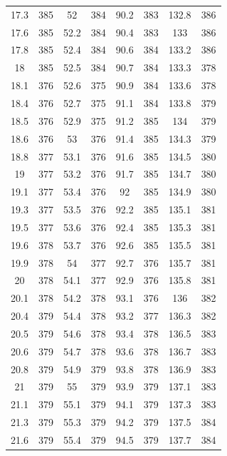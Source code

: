\documentclass[12pt]{ctexart}
\numberwithin{equation}{section}
\begin{document}
\begin{longtable}{cc|cc|cc|cc}
17.3  &  385  &  52  &  384  &  90.2  &  383  &  132.8  &  386  \\
17.6  &  385  &  52.2  &  384  &  90.4  &  383  &  133  &  386  \\
17.8  &  385  &  52.4  &  384  &  90.6  &  384  &  133.2  &  386  \\
18  &  385  &  52.5  &  384  &  90.7  &  384  &  133.3  &  378  \\
18.1  &  376  &  52.6  &  375  &  90.9  &  384  &  133.6  &  378  \\
18.4  &  376  &  52.7  &  375  &  91.1  &  384  &  133.8  &  379  \\
18.5  &  376  &  52.9  &  375  &  91.2  &  385  &  134  &  379  \\
18.6  &  376  &  53  &  376  &  91.4  &  385  &  134.3  &  379  \\
18.8  &  377  &  53.1  &  376  &  91.6  &  385  &  134.5  &  380  \\
19  &  377  &  53.2  &  376  &  91.7  &  385  &  134.7  &  380  \\
19.1  &  377  &  53.4  &  376  &  92  &  385  &  134.9  &  380  \\
19.3  &  377  &  53.5  &  376  &  92.2  &  385  &  135.1  &  381  \\
19.5  &  377  &  53.6  &  376  &  92.4  &  385  &  135.3  &  381  \\
19.6  &  378  &  53.7  &  376  &  92.6  &  385  &  135.5  &  381  \\
19.9  &  378  &  54  &  377  &  92.7  &  376  &  135.7  &  381  \\
20  &  378  &  54.1  &  377  &  92.9  &  376  &  135.8  &  381  \\
20.1  &  378  &  54.2  &  378  &  93.1  &  376  &  136  &  382  \\
20.4  &  379  &  54.4  &  378  &  93.2  &  377  &  136.3  &  382  \\
20.5  &  379  &  54.6  &  378  &  93.4  &  378  &  136.5  &  383  \\
20.6  &  379  &  54.7  &  378  &  93.6  &  378  &  136.7  &  383  \\
20.8  &  379  &  54.9  &  379  &  93.8  &  378  &  136.9  &  383  \\
21  &  379  &  55  &  379  &  93.9  &  379  &  137.1  &  383  \\
21.1  &  379  &  55.1  &  379  &  94.1  &  379  &  137.3  &  383  \\
21.3  &  379  &  55.3  &  379  &  94.2  &  379  &  137.5  &  384  \\
21.6  &  379  &  55.4  &  379  &  94.5  &  379  &  137.7  &  384  \\

\end{longtable}
\end{document}
